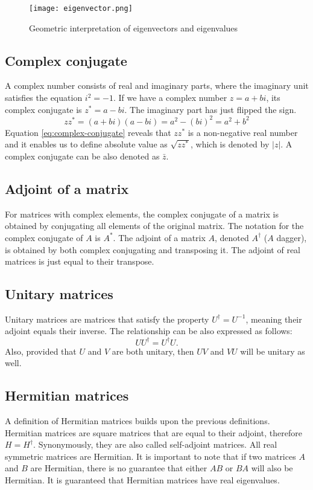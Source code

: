 \begin{figure}[H]
  \centering
  \texttt{[image: eigenvector.png]}
  \caption{Geometric interpretation of eigenvectors and eigenvalues \cite{img:eigen}}
  \label{fig:eigen}
\end{figure} 

\subsection*{Complex conjugate}
A complex number consists of real and imaginary parts, where the imaginary unit satisfies the equation $i^2 = -1$. If we have a complex number $z = a + bi$, its complex conjugate is $z^{*} = a - bi$. The imaginary part has just flipped the sign. 
\begin{equation}\label{eq:complex-conjugate}
zz^{*} = (a + bi)(a - bi) = a^2 - (bi)^2 = a^2 + b^2
\end{equation}
Equation \ref{eq:complex-conjugate} reveals that $zz^{*}$ is a non-negative real number and it enables us to define absolute value as $\sqrt{zz^{*}}$, which is denoted by $\lvert z \rvert$. A complex conjugate can be also denoted as $\bar{z}$.

\subsection*{Adjoint of a matrix}
For matrices with complex elements, the complex conjugate of a matrix is obtained by conjugating all elements of the original matrix. The notation for the complex conjugate of $A$ is $A^*$. The adjoint of a matrix $A$, denoted $A^\dag$ ($A$ dagger), is obtained by both complex conjugating and transposing it. The adjoint of real matrices is just equal to their transpose.

\subsection*{Unitary matrices}
Unitary matrices are matrices that satisfy the property $U^\dag = U^{-1}$, meaning their adjoint equals their inverse. The relationship can be also expressed as follows:
\begin{equation}
U U^{\dag} = U^{\dag} U\text{.}
\end{equation}
Also, provided that $U$ and $V$ are both unitary, then $UV$ and $VU$ will be unitary as well.

\subsection*{Hermitian matrices}
A definition of Hermitian matrices builds upon the previous definitions. Hermitian matrices are square matrices that are equal to their adjoint, therefore $H = H^\dag$. Synonymously, they are also called self-adjoint matrices. All real symmetric matrices are Hermitian. It is important to note that if two matrices $A$ and $B$ are Hermitian, there is no guarantee that either $AB$ or $BA$ will also be Hermitian. It is guaranteed that Hermitian matrices have real eigenvalues.

